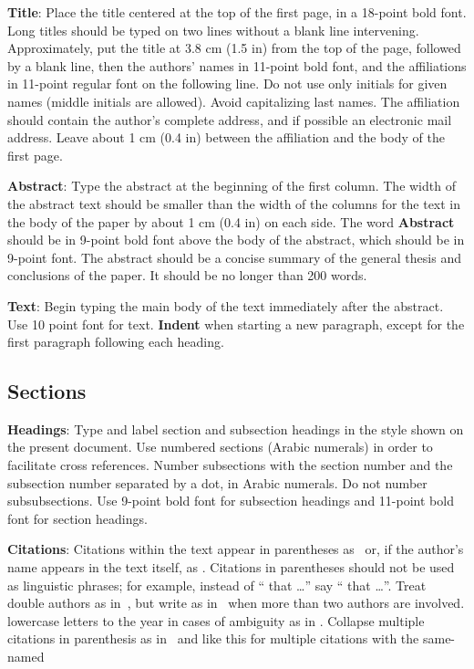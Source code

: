 \documentclass[]{article}
\begin{document}
{\bf Title}: Place the title centered at the top of the first page, in
a 18-point bold font. Long titles should be typed on two lines without
a blank line intervening. Approximately, put the title at 3.8 cm (1.5
in) from the top of the page, followed by a blank line, then the
authors' names in 11-point bold font, and the affiliations in 11-point
regular font on the following line. Do not use only initials for given
names (middle initials are allowed). Avoid capitalizing last
names. The affiliation should contain the author's complete address,
and if possible an electronic mail address. Leave about 1 cm (0.4 in)
between the affiliation and the body of the first page.

{\bf Abstract}: Type the abstract at the beginning of the first
column. The width of the abstract text should be smaller than the
width of the columns for the text in the body of the paper by about 1
cm (0.4 in) on each side. The word {\bf Abstract} should be in 9-point
bold font above the body of the abstract, which should be in 9-point
font. The abstract should be a concise summary of the general thesis
and conclusions of the paper. It should be no longer than 200 words.

{\bf Text}: Begin typing the main body of the text immediately after
the abstract. Use 10 point font for text. {\bf Indent} when starting a
new paragraph, except for the first paragraph following each heading.


\subsection{Sections}

{\bf Headings}: Type and label section and subsection headings in the
style shown on the present document.  Use numbered sections (Arabic
numerals) in order to facilitate cross references. Number subsections
with the section number and the subsection number separated by a dot,
in Arabic numerals. Do not number subsubsections. Use 9-point bold
font for subsection headings and 11-point bold font for section
headings.

{\bf Citations}: Citations within the text appear in parentheses
as~\citep{Smith} or, if the author's name appears in the text itself,
as \cite{Smith}. Citations in parentheses should not be used as
linguistic phrases; for example, instead of ``\citep{Smith}
 that \ldots'' say ``\cite{Smith} 
that \ldots''.  Treat double authors as in~\citep{DD15}, but write as
in~\citep{PDC} when more than two authors are involved.
 lowercase letters to the year in cases of ambiguity
as in \citep{JonesFirst}.  Collapse multiple citations in parenthesis
as in~\citep{Smith,JonesFirst} and like this for multiple citations
with the same-named 
\citep{Smith,SmithConc,JonesFirst,JonesSecond}
\end{document}

